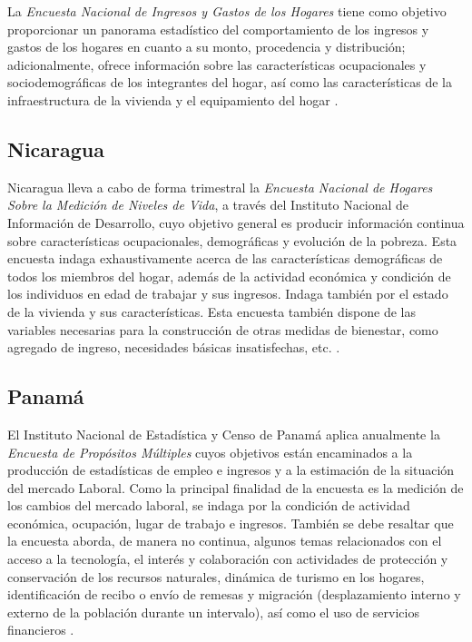\documentclass[
  12pt,
]{book}
\begin{document}
La \emph{Encuesta Nacional de Ingresos y Gastos de los Hogares} tiene como objetivo proporcionar un panorama estadístico del comportamiento de los ingresos y gastos de los hogares en cuanto a su monto, procedencia y distribución; adicionalmente, ofrece información sobre las características ocupacionales y sociodemográficas de los integrantes del hogar, así como las características de la infraestructura de la vivienda y el equipamiento del hogar \citep{INEGI2-MX}.

\hypertarget{nicaragua}{%
\subsection{Nicaragua}\label{nicaragua}}

Nicaragua lleva a cabo de forma trimestral la \emph{Encuesta Nacional de Hogares Sobre la Medición de Niveles de Vida}, a través del Instituto Nacional de Información de Desarrollo, cuyo objetivo general es producir información continua sobre características ocupacionales, demográficas y evolución de la pobreza. Esta encuesta indaga exhaustivamente acerca de las características demográficas de todos los miembros del hogar, además de la actividad económica y condición de los individuos en edad de trabajar y sus ingresos. Indaga también por el estado de la vivienda y sus características. Esta encuesta también dispone de las variables necesarias para la construcción de otras medidas de bienestar, como agregado de ingreso, necesidades básicas insatisfechas, etc. \citep{INIDE-NI}.

\hypertarget{panamuxe1}{%
\subsection{Panamá}\label{panamuxe1}}

El Instituto Nacional de Estadística y Censo de Panamá aplica anualmente la \emph{Encuesta de Propósitos Múltiples} cuyos objetivos están encaminados a la producción de estadísticas de empleo e ingresos y a la estimación de la situación del mercado Laboral. Como la principal finalidad de la encuesta es la medición de los cambios del mercado laboral, se indaga por la condición de actividad económica, ocupación, lugar de trabajo e ingresos. También se debe resaltar que la encuesta aborda, de manera no continua, algunos temas relacionados con el acceso a la tecnología, el interés y colaboración con actividades de protección y conservación de los recursos naturales, dinámica de turismo en los hogares, identificación de recibo o envío de remesas y migración (desplazamiento interno y externo de la población durante un intervalo), así como el uso de servicios financieros \citep{INEC-PA}.
\end{document}
